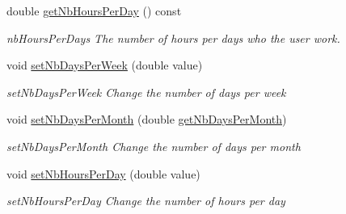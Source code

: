 \begin{DoxyCompactItemize}
double \hyperlink{classGui_1_1Widgets_1_1UserDailyHoursWidget_a59d414f77e85613a1c63b2cd49ff4a1e}{get\-Nb\-Hours\-Per\-Day} () const 
\begin{DoxyCompactList}\small\item\em nb\-Hours\-Per\-Days The number of hours per days who the user work. \end{DoxyCompactList}\item 
void \hyperlink{classGui_1_1Widgets_1_1UserDailyHoursWidget_a3d5a6241895d8b075eb52abd3aba8623}{set\-Nb\-Days\-Per\-Week} (double value)
\begin{DoxyCompactList}\small\item\em set\-Nb\-Days\-Per\-Week Change the number of days per week \end{DoxyCompactList}\item 
void \hyperlink{classGui_1_1Widgets_1_1UserDailyHoursWidget_a8c9c2035420ab416df97ff295a3fae31}{set\-Nb\-Days\-Per\-Month} (double \hyperlink{classGui_1_1Widgets_1_1UserDailyHoursWidget_a621fb253d8db77007b9f80f901ba8451}{get\-Nb\-Days\-Per\-Month})
\begin{DoxyCompactList}\small\item\em set\-Nb\-Days\-Per\-Month Change the number of days per month \end{DoxyCompactList}\item 
void \hyperlink{classGui_1_1Widgets_1_1UserDailyHoursWidget_a4cf841f641023bc5839f8b9df918f0fa}{set\-Nb\-Hours\-Per\-Day} (double value)
\begin{DoxyCompactList}\small\item\em set\-Nb\-Hours\-Per\-Day Change the number of hours per day \end{DoxyCompactList}\end{DoxyCompactItemize}
